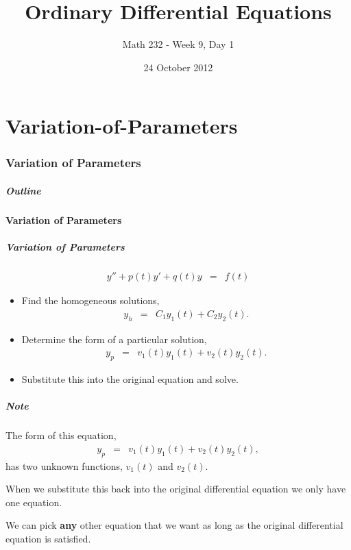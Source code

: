 \part{Variation-of-Parameters}
\section{Variation of Parameters}

\title{Ordinary Differential Equations}
\subtitle{Math 232 - Week 9, Day 1}
\date{24 October 2012}

\begin{frame}
  \titlepage
\end{frame}

\begin{frame}
  \frametitle{Outline}
\end{frame}


\subsection{Variation of Parameters}


\begin{frame}
  \frametitle{Variation of Parameters}

  \begin{eqnarray*}
    y'' + p(t) y' + q(t) y & = & f(t)
  \end{eqnarray*}

  \begin{itemize}
  \item Find the homogeneous solutions,
    \begin{eqnarray*}
      y_h & = & C_1 y_1(t) + C_2 y_2(t).
    \end{eqnarray*}
  \item Determine the form of a particular solution,
    \begin{eqnarray*}
      y_p & = & v_1(t) y_1(t) + v_2(t) y_2(t).
    \end{eqnarray*}
  \item Substitute this into the original equation and solve.
  \end{itemize}

\end{frame}


\begin{frame}
  \frametitle{Note}

  The form of this equation,
  \begin{eqnarray*}
    y_p & = & v_1(t) y_1(t) + v_2(t) y_2(t),
  \end{eqnarray*}
  has two unknown functions, $v_1(t)$ and $v_2(t)$.
  

  When we substitute this back into the original differential equation
  we only have one equation.

  We can pick \textbf{any} other equation that we want as long as the
  original differential equation is satisfied.

\end{frame}


